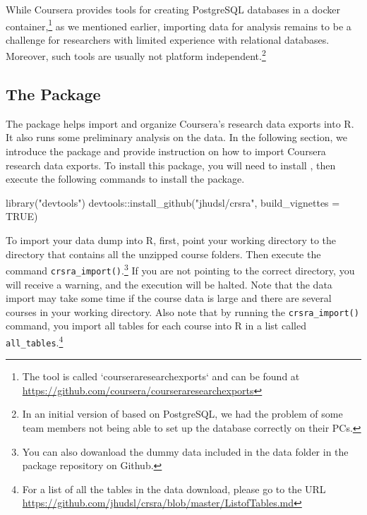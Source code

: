 While Coursera provides tools for creating PostgreSQL databases in a
docker
container,\footnote{The tool is called `courseraresearchexports` and can be found at \url{https://github.com/coursera/courseraresearchexports}}
as we mentioned earlier, importing data for analysis remains to be a
challenge for researchers with limited experience with relational
databases. Moreover, such tools are usually not platform
independent.\footnote{In an initial version of  based on PostgreSQL, we had the problem of some team members not being able to set up the database correctly on their PCs.}

\subsection{\texorpdfstring{The 
Package}{The  Package}}\label{the-package}

The  package helps import and organize Coursera's research
data exports into R. It also runs some preliminary analysis on the data.
In the following section, we introduce the package and provide
instruction on how to import Coursera research data exports. To install
this package, you will need to install 
\citep{devtools}, then execute the following commands to install the
 package.

\begin{Schunk}
\begin{Sinput}
library("devtools")
devtools::install_github("jhudsl/crsra", build_vignettes = TRUE)
\end{Sinput}
\end{Schunk}

To import your data dump into R, first, point your working directory to
the directory that contains all the unzipped course folders. Then
execute the command
\texttt{crsra\_import()}.\footnote{You can also dowanload the dummy data included in the data folder in the package repository on Github.}
If you are not pointing to the correct directory, you will receive a
warning, and the execution will be halted. Note that the data import may
take some time if the course data is large and there are several courses
in your working directory. Also note that by running the
\texttt{crsra\_import()} command, you import all tables for each course
into R in a list called
\texttt{all\_tables}.\footnote{For a list of all the tables in the data download, please go to the URL \url{https://github.com/jhudsl/crsra/blob/master/ListofTables.md}}

